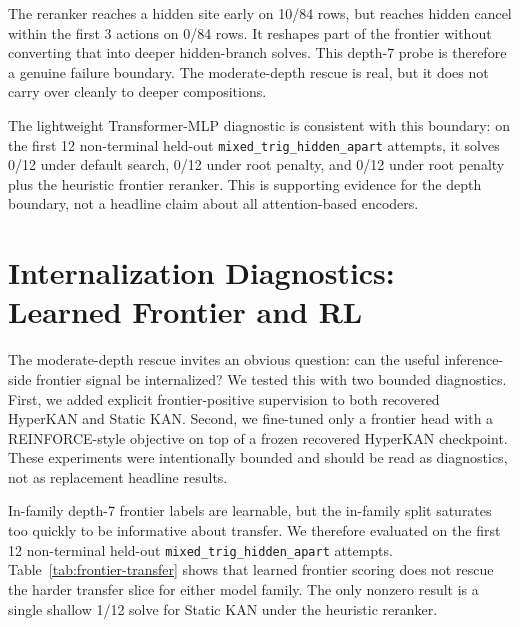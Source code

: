 \documentclass[11pt]{article}
\newcommand{\hyperkan}{HyperKAN}
\newcommand{\staticKAN}{Static KAN}
\newcommand{\mlp}{MLP}
\begin{document}
The reranker reaches a hidden site early on 10/84 rows, but reaches hidden cancel within the first 3 actions on 0/84 rows. It reshapes part of the frontier without converting that into deeper hidden-branch solves. This depth-7 probe is therefore a genuine failure boundary. The moderate-depth rescue is real, but it does not carry over cleanly to deeper compositions.

The lightweight Transformer-\mlp{} diagnostic is consistent with this boundary: on the first 12 non-terminal held-out \texttt{mixed\_trig\_hidden\_apart} attempts, it solves 0/12 under default search, 0/12 under root penalty, and 0/12 under root penalty plus the heuristic frontier reranker. This is supporting evidence for the depth boundary, not a headline claim about all attention-based encoders.

\section{Internalization Diagnostics: Learned Frontier and RL}

The moderate-depth rescue invites an obvious question: can the useful inference-side frontier signal be internalized? We tested this with two bounded diagnostics. First, we added explicit frontier-positive supervision to both recovered \hyperkan{} and \staticKAN{}. Second, we fine-tuned only a frontier head with a REINFORCE-style objective on top of a frozen recovered \hyperkan{} checkpoint. These experiments were intentionally bounded and should be read as diagnostics, not as replacement headline results.

In-family depth-7 frontier labels are learnable, but the in-family split saturates too quickly to be informative about transfer. We therefore evaluated on the first 12 non-terminal held-out \texttt{mixed\_trig\_hidden\_apart} attempts. Table~\ref{tab:frontier-transfer} shows that learned frontier scoring does not rescue the harder transfer slice for either model family. The only nonzero result is a single shallow 1/12 solve for \staticKAN{} under the heuristic reranker.
\end{document}
